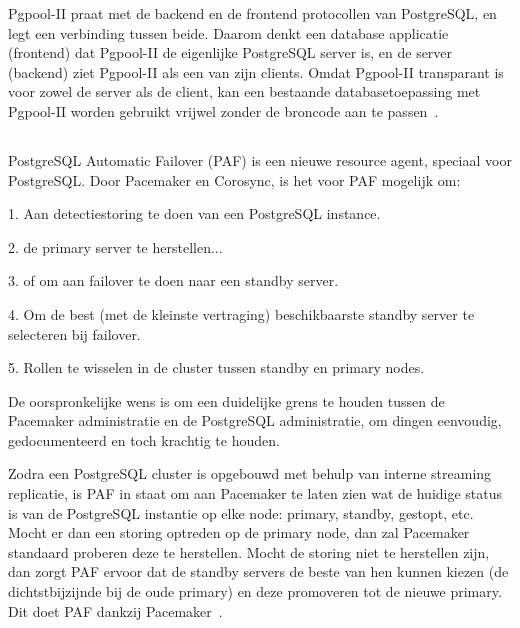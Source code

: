 Pgpool-II praat met de backend en de frontend protocollen van PostgreSQL, en legt een verbinding tussen beide. Daarom denkt een database applicatie (frontend) dat Pgpool-II de eigenlijke PostgreSQL server is, en de server (backend) ziet Pgpool-II als een van zijn clients. Omdat Pgpool-II transparant is voor zowel de server als de client, kan een bestaande databasetoepassing met Pgpool-II worden gebruikt vrijwel zonder de broncode aan te passen~\autocite{2021}. %


\subsection{}
\label{subsec:PostgreSQL Automatic Failover (PAF)}

PostgreSQL Automatic Failover (PAF) is een nieuwe resource agent, speciaal voor PostgreSQL. Door Pacemaker en Corosync, is het voor PAF mogelijk om:

1. Aan detectiestoring te doen van een PostgreSQL instance.

2. de primary server te herstellen...

3. of om aan failover te doen naar een standby server.

4. Om de best (met de kleinste vertraging) beschikbaarste standby server te selecteren bij failover.

5. Rollen te wisselen in de cluster tussen standby en primary nodes.


De oorspronkelijke wens is om een duidelijke grens te houden tussen de Pacemaker administratie en de PostgreSQL administratie, om dingen eenvoudig, gedocumenteerd en toch krachtig te houden.

Zodra een PostgreSQL cluster is opgebouwd met behulp van interne streaming replicatie, is PAF in staat om aan Pacemaker te laten zien wat de huidige status is van de PostgreSQL instantie op elke node: primary, standby, gestopt, etc. Mocht er dan een storing optreden op de primary node, dan zal Pacemaker standaard proberen deze te herstellen. Mocht de storing niet te herstellen zijn, dan zorgt PAF ervoor dat de standby servers de beste van hen kunnen kiezen (de dichtstbijzijnde bij de oude primary) en deze promoveren tot de nieuwe primary. Dit doet PAF dankzij Pacemaker~\autocite{Rimbault2020}. %

